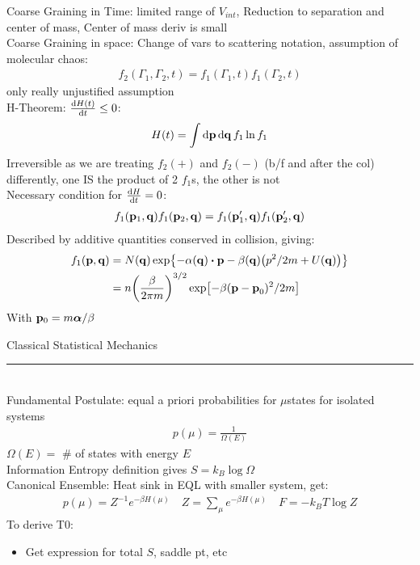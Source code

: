 \documentclass[8pt]{article}
\begin{document}
\begin{multicols*}{2}
  Coarse Graining in Time: limited range of $V_{int}$, Reduction to separation and center of mass, Center of mass deriv is small \\
  Coarse Graining in space: Change of vars to scattering notation, assumption of molecular chaos:
  \begin{gather*}
    f_2(\Gamma_1,\Gamma_2,t)=f_1(\Gamma_1,t)f_1(\Gamma_2,t)
  \end{gather*}
  only really unjustified assumption\\
  H-Theorem: $\dv{H(t)}{t}\leq0$:
    \begin{gather*}
      H(t)=\int\dd{\vb{p}}\dd{\vb{q}}f_1\ln f_1
    \end{gather*}
    Irreversible as we are treating $f_2(+)$ and $f_2(-)$ (b/f and after the col) differently, one IS the product of 2 $f_1$s, the other is not\\
  Necessary condition for $\dv{H}{t}=0$:
  \begin{gather*}
    f_1(\vb{p}_1,\vb{q})f_1(\vb{p}_2,\vb{q})=
    f_1(\vb{p}_1',\vb{q})f_1(\vb{p}_2',\vb{q})
  \end{gather*}
  Described by additive quantities conserved in collision, giving:
  \begin{align*}
    f_1(\vb{p},\vb{q})&=N(\vb{q})\exp{-\alpha(\vb{q})\vdot\vb{p}
      -\beta(\vb{q})\qty(p^2/2m+U(\vb{q}))}\\
    &=n\qty(\frac{\beta}{2\pi m})^{3/2}\exp[-\beta(\vb{p-p}_0)^2/2m]
  \end{align*}
  With $\vb{p}_0=m\bm{\alpha}/\beta$
  \begin{center}
    \normalsize{Classical Statistical Mechanics}
  \end{center}
    \hrule~\\
  Fundamental Postulate: equal a priori probabilities for $\mu$states for isolated systems
  \begin{gather*}
    p(\mu)=\frac1{\Omega(E)}
  \end{gather*}
  $\Omega(E)=$ \# of states with energy $E$\\
  Information Entropy definition gives $S=k_B\log\Omega$\\
  Canonical Ensemble: Heat sink in EQL with smaller system, get:
  \begin{align*}
    p(\mu)=Z^{-1}e^{-\beta H(\mu)}\quad
    Z=\sum_\mu e^{-\beta H(\mu)}\quad
    F=-k_BT\log Z
  \end{align*}
  To derive T0:
  \begin{itemize}
  \item Get expression for total $S$, saddle pt, etc

\end{itemize}
\end{multicols*}
\end{document}
